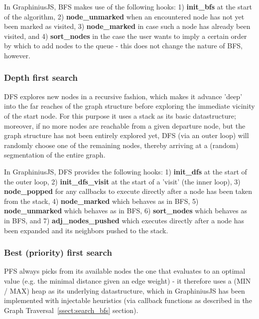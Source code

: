 		In GraphiniusJS, BFS makes use of the following hooks: 1) \textbf{init\_bfs} at the start of the algorithm, 2) \textbf{node\_unmarked} when an encountered node has not yet been marked as visited, 3) \textbf{node\_marked} in case such a node has already been visited, and 4) \textbf{sort\_nodes} in the case the user wants to imply a certain order by which to add nodes to the queue - this does not change the nature of BFS, however.
		
		\subsubsection{Depth first search}
		\label{sssect:search_dfs}
		
		DFS explores new nodes in a recursive fashion, which makes it advance 'deep' into the far reaches of the graph structure before exploring the immediate vicinity of the start node. For this purpose it uses a stack as its basic datastructure; moreover, if no more nodes are reachable from a given departure node, but the graph structure has not been entirely explored yet, DFS (via an outer loop) will randomly choose one of the remaining nodes, thereby arriving at a (random) segmentation of the entire graph.
		
		In GraphiniusJS, DFS provides the following hooks: 1) \textbf{init\_dfs} at the start of the outer loop, 2) \textbf{init\_dfs\_visit} at the start of a 'visit' (the inner loop), 3) \textbf{node\_popped} for any callbacks to execute directly after a node has been taken from the stack, 4) \textbf{node\_marked} which behaves as in BFS, 5) \textbf{node\_unmarked} which behaves as in BFS, 6) \textbf{sort\_nodes} which behaves as in BFS, and 7) \textbf{adj\_nodes\_pushed} which executes directly after a node has been expanded and its neighbors pushed to the stack.
		
		\subsubsection{Best (priority) first search}
		\label{sssect:search_pfs}
		
		PFS always picks from its available nodes the one that evaluates to an optimal value (e.g. the minimal distance given an edge weight) - it therefore uses a (MIN / MAX) heap as its underlying datastructure, which in GraphiniusJS has been implemented with injectable heuristics (via callback functions as described in the Graph Traversal~\ref{ssect:search_bfs} section).
		
